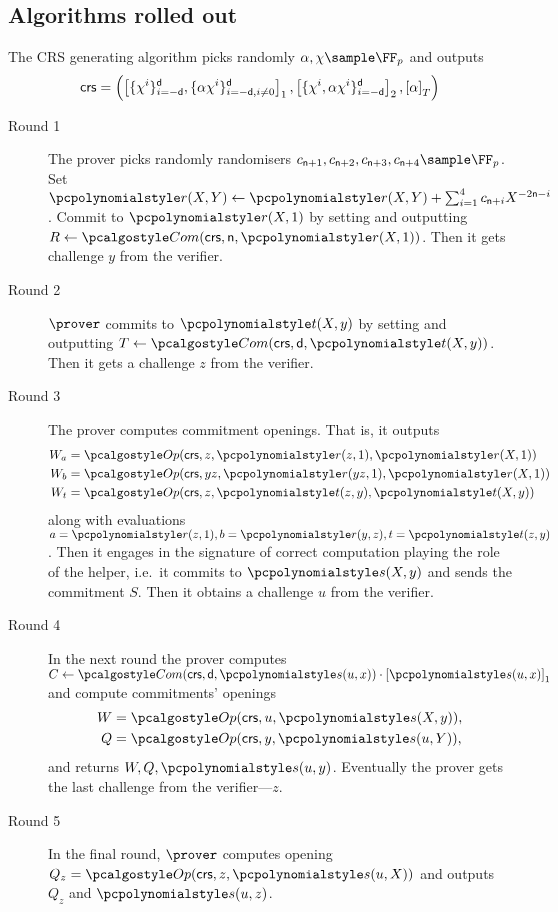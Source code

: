 \let\accentvec\vec \documentclass[runningheads,10pt]{llncs}
\begin{document}
	\subsection{Algorithms rolled out}
	The CRS generating algorithm picks randomly $\alpha, \chi \sample \FF_p$ and
	outputs 
	\[
		\mathsf{crs} = \left( \left[\{\chi^i\}_{i = -\mathsf{d}}^{\mathsf{d}},
			\{\alpha \chi^i\}_{i = -\mathsf{d}, i \neq 0}^{\mathsf{d}}\right]_{1},
			\left[\{\chi^i, \alpha \chi^i\}_{i = - \mathsf{d}}^{\mathsf{d}}\right]_{2},
		\left[\alpha\right]_{T} \right)
	\]
\begin{description}
	\item[Round 1]
		The prover picks randomly randomisers $c_{\multconstr + 1}, c_{\multconstr + 2},
		c_{\multconstr + 3}, c_{\multconstr + 4} \sample \FF_p$. Set $\pr(X, Y)
		\gets \pr(X, Y) + \sum_{i = 1}^4 c_{\multconstr + i} X^{- 2 \multconstr -
		i}$. Commit to $\pr(X, 1)$ by setting and outputting $R \gets \com(\crs, \multconstr,
		\pr(X, 1))$.
		Then it gets challenge $y$ from the verifier.
	\item[Round 2] $\prover$ commits to $\pt(X, y)$ by setting and outputting $T
		\gets \com(\crs, \dconst, \pt(X, y))$. Then it gets a challenge $z$ from
		the verifier.
	\item[Round 3] The prover computes commitment openings. That is, it outputs
		\begin{align*}
			W_a & = \open(\crs, z, \pr(z, 1), \pr(X, 1)) \\
			W_b & = \open(\crs, yz, \pr(yz, 1), \pr(X, 1)) \\
			W_t & = \open(\crs, z, \pt(z, y), \pt(X, y)) 
		\end{align*}
		along with evaluations $a = \pr(z, 1), b = \pr(y, z), t = \pt(z, y)$.
		Then it engages in the signature of correct computation playing the role of
		the helper, i.e.~it commits to $\p{s}(X, y)$ and sends the commitment $S$.
		Then it obtains a challenge $u$ from the verifier.
	\item[Round 4] In the next round the prover computes $C \gets \com(\crs,
		\dconst, \p{s}(u, x)) \cdot \gone{\p{s}(u, x)}$ and compute commitments'
		openings 
		\begin{align*}
			W & = \open(\crs, u, \p{s}(X, y)), \\
			Q & = \open(\crs, y, \p{s}(u, Y)),
		\end{align*}
		and returns $W, Q, \p{s}(u, y)$. Eventually the prover gets the last
		challenge from the verifier---$z$.
	\item[Round 5] In the final round, $\prover$ computes opening $Q_z =
		\open(\crs, z, \p{s}(u, X))$ and outputs $Q_z$ and $\p{s}(u, z)$. 
\end{description}
\end{document}
